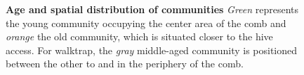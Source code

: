 \begin{figure}[!htb]
	
	\caption[Age and spatial distribution of communities]{
	\textbf{Age and spatial distribution of communities}
	\emph{Green} represents the young community occupying the center area of the comb and \emph{orange} the old community, which is situated closer to the hive access.
	For walktrap, the \emph{gray} middle-aged community is positioned between the other to and in the periphery of the comb.}
	\label{fig:n3-communities}
\end{figure}
